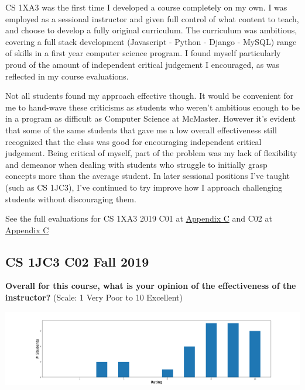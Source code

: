 \documentclass[12pt]{report}
\begin{document}
CS 1XA3 was the first time I developed a course completely on my own. I was
employed as a sessional instructor and given full control of what content to
teach, and choose to develop a fully original curriculum. The curriculum was
ambitious, covering a full stack development (Javascript - Python - Django -
MySQL) range of skills in a first year computer science program. I found
myself particularly proud of the amount of independent critical judgement I
encouraged, as was reflected in my course evaluations.

Not all students found my approach effective though. It would be convenient
for me to hand-wave these criticisms as students who weren't ambitious enough
to be in a program as difficult as Computer Science at McMaster. However it's
evident that some of the same students that gave me a low overall
effectiveness still recognized that the class was good for encouraging
independent critical judgement. Being critical of myself, part of the problem
was my lack of flexibility and demeanor when dealing with students who
struggle to initially grasp concepts more than the average student. In later
sessional positions I've taught (such as CS 1JC3), I've continued to try
improve how I approach challenging students without discouraging them.

See the full evaluations for CS 1XA3 2019 C01 at \hyperref[sec:1xa3c01evals]{Appendix C} and C02 at \hyperref[sec:1xa3c02evals]{Appendix C}

\newpage
\subsection{CS 1JC3 C02 Fall 2019}
\label{sec:orgda422f0}

\textbf{Overall for this course, what is your opinion of the effectiveness of the
instructor?} (Scale: 1 Very Poor to 10 Excellent)

\begin{center}
\includegraphics[width=1.0\textwidth,height=0.5\textwidth]{./course-evals/Eval_1JC3_2019_Overall.png}
\end{center}
\end{document}
